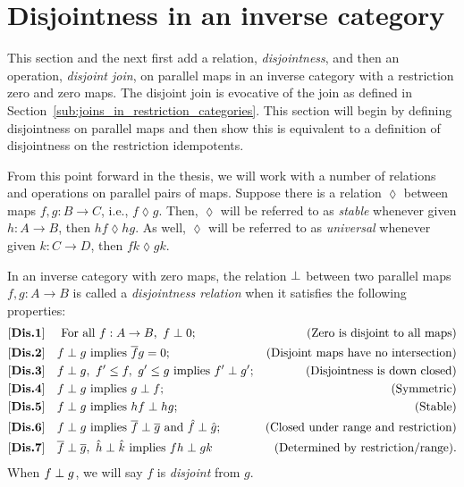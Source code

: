 \section{Disjointness in an inverse category} %
\label{sec:disjointness_in_an_inverse_category}
This section and the next first add a relation, \emph{disjointness}, and then an operation,
\emph{disjoint join}, on parallel maps in  an inverse category with a restriction zero and zero
maps. The disjoint join is evocative of the join as defined in
Section~\ref{sub:joins_in_restriction_categories}. This section will begin by defining disjointness
on parallel maps and then show this is equivalent to a definition of disjointness on the restriction
idempotents.

From this point forward in the thesis, we will work with a number of relations and operations on
parallel pairs of maps. Suppose there is a relation $\lozenge$ between maps $f,g:B\to C$, i.e., $f
\lozenge g$. Then, $\lozenge$ will be referred to as \emph{stable} whenever given $h:A \to B$, then $h f
\lozenge h g$. As well, $\lozenge$ will be referred to as \emph{universal} whenever given $k:C \to D$, then $f
k \lozenge g k$.


\begin{definition}\label{def:disjointness_relation}
  In an inverse category \X with zero maps, the relation $\perp$ between two parallel
  maps $f, g:A \to B$ is called a \emph{disjointness relation} when it satisfies the following
  properties:
  \begin{align*}
    \axiom{Dis}{1}\quad &\text{ For all }f:A\to B,\ f\cdperp 0;&\text{(Zero is disjoint to all maps)}\\
    \axiom{Dis}{2}\quad &f\cdperp g\text{ implies }\rst{f} g = 0; &\text{(Disjoint maps have no intersection)}\\
    \axiom{Dis}{3}\quad &f\cdperp g,\ f' \le f,\ g' \le g\text{ implies }f' \cdperp
    g';&\text{(Disjointness is down closed)}\\
    \axiom{Dis}{4}\quad &f\cdperp g\text{ implies }g \cdperp f; &\text{(Symmetric)}\\
    \axiom{Dis}{5}\quad &f\cdperp g\text{ implies }h f \cdperp h g; &\text{(Stable)}\\
    \axiom{Dis}{6}\quad &f\cdperp g\text{ implies }\rst{f} \cdperp \rst{g}
      \text{ and }\rg{f}\cdperp\rg{g}; &\text{(Closed under range and restriction)}\\
    \axiom{Dis}{7}\quad &\rst{f}\cdperp \rst{g},\ \rg{h}\cdperp \rg{k}\text{ implies }f h
      \cdperp g k &\text{(Determined by restriction/range).}
  \end{align*}
  When $f\perp g$, we will say $f$ is \emph{disjoint} from $g$.
\end{definition}

